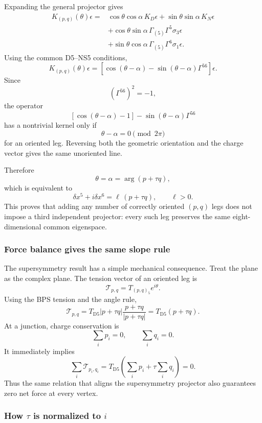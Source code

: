 \documentclass[
  10pt,
  a4paper,
  openany]{book}
\begin{document}
Expanding the general projector gives \[
\begin{aligned}
K_{(p,q)}(\theta)\epsilon
={}&
\cos\theta\cos\alpha\,
K_D\epsilon
+\sin\theta\sin\alpha\,
K_N\epsilon\\
&+\cos\theta\sin\alpha\,
\Gamma_{(5)}\Gamma^5\sigma_3\epsilon\\
&+\sin\theta\cos\alpha\,
\Gamma_{(5)}\Gamma^6\sigma_1\epsilon.
\end{aligned}
\] Using the common D5--NS5 conditions, \[
K_{(p,q)}(\theta)\epsilon
=
\left[
\cos(\theta-\alpha)
-\sin(\theta-\alpha)\Gamma^{56}
\right]\epsilon.
\] Since \[
(\Gamma^{56})^2=-1,
\] the operator \[
\left[\cos(\theta-\alpha)-1\right]
-\sin(\theta-\alpha)\Gamma^{56}
\] has a nontrivial kernel only if \[
\theta-\alpha=0\pmod{2\pi}
\] for an oriented leg. Reversing both the geometric orientation and the
charge vector gives the same unoriented line.

Therefore \[
\boxed{
\theta=\alpha=\arg(p+\tau q)
},
\] which is equivalent to \[
\boxed{
\delta x^5+i\delta x^6
=\ell\,(p+\tau q),
\qquad
\ell>0
}.
\] This proves that adding any number of correctly oriented \((p,q)\)
legs does not impose a third independent projector: every such leg
preserves the same eight-dimensional common eigenspace.

\subsubsection{Force balance gives the same slope
rule}\label{force-balance-gives-the-same-slope-rule}

The supersymmetry result has a simple mechanical consequence. Treat the
plane as the complex plane. The tension vector of an oriented leg is \[
\mathcal T_{p,q}
=T_{(p,q)_5}e^{i\theta}.
\] Using the BPS tension and the angle rule, \[
\mathcal T_{p,q}
=T_{\mathrm{D5}}|p+\tau q|
\frac{p+\tau q}{|p+\tau q|}
=T_{\mathrm{D5}}(p+\tau q).
\] At a junction, charge conservation is \[
\sum_i p_i=0,
\qquad
\sum_i q_i=0.
\] It immediately implies \[
\sum_i\mathcal T_{p_i,q_i}
=T_{\mathrm{D5}}
\left(
\sum_i p_i+\tau\sum_iq_i
\right)
=0.
\] Thus the same relation that aligns the supersymmetry projector also
guarantees zero net force at every vertex.

\subsubsection{\texorpdfstring{How \(\tau\) is normalized to
\(i\)}{How \textbackslash tau is normalized to i}}\label{how-tau-is-normalized-to-i}
\end{document}
